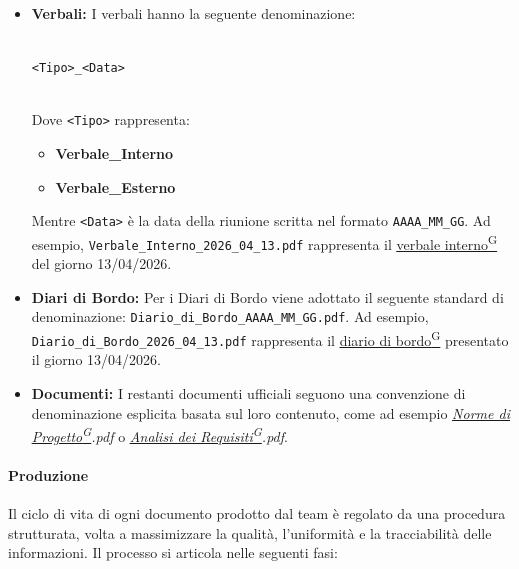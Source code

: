 \documentclass[a4paper,12pt]{article}
\providecommand{\glslink}[2]{\href{https://alittlebyte-19.github.io/Documentazione/glossario.html\#gls-#1}{\underline{#2}\textsuperscript{\scriptsize G}}}
\begin{document}
\begin{itemize}
    \item \textbf{Verbali:} I verbali hanno la seguente denominazione: \\
    \\
    \centerline{\texttt{<Tipo>\_<Data>}} \\
    Dove \texttt{<Tipo>} rappresenta:
    \begin{itemize}
        \item \textbf{Verbale\_Interno}
        \item \textbf{Verbale\_Esterno}
    \end{itemize}
    Mentre \texttt{<Data>} è la data della riunione scritta nel formato \texttt{AAAA\_MM\_GG}. Ad esempio, \texttt{Verbale\_Interno\_2026\_04\_13.pdf} rappresenta il \glslink{verbale-interno}{verbale interno} del giorno 13/04/2026.
    \\
    
    \item \textbf{Diari di Bordo:} Per i Diari di Bordo viene adottato il seguente standard di denominazione: \texttt{Diario\_di\_Bordo\_AAAA\_MM\_GG.pdf}. Ad esempio, \texttt{Diario\_di\_Bordo\_2026\_04\_13.pdf} rappresenta il \glslink{diario-di-bordo}{diario di bordo} presentato il giorno 13/04/2026.
    
    \item \textbf{Documenti:} I restanti documenti ufficiali seguono una convenzione di denominazione esplicita basata sul loro contenuto, come ad esempio \textit{\glslink{norme-di-progetto}{Norme di Progetto}.pdf} o \textit{\glslink{analisi-dei-requisiti-adr}{Analisi dei Requisiti}.pdf}. 
\end{itemize}

\paragraph{Produzione}
Il ciclo di vita di ogni documento prodotto dal team è regolato da una procedura strutturata, volta a massimizzare la qualità, l'uniformità e la tracciabilità delle informazioni. Il processo si articola nelle seguenti fasi:
\end{document}
